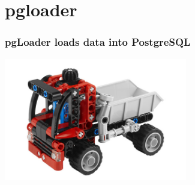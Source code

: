 \documentclass[xcolor=dvipsnames]{beamer}
\begin{document}
\section{pgloader}

{
  \begin{frame}[plain]
  \end{frame}
}

\begin{frame}[fragile]
  \frametitle{pgLoader loads data into PostgreSQL}


  \begin{center}
    \includegraphics[height=2.1in]{pgloader.jpg}
  \end{center}
\end{frame}
\end{document}
